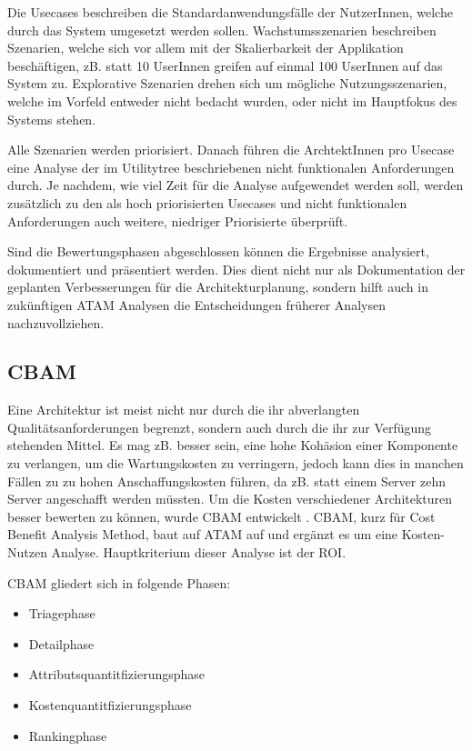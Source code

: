 Die Usecases beschreiben die Standardanwendungsfälle der NutzerInnen, welche durch das System umgesetzt werden sollen. Wachstumsszenarien beschreiben Szenarien, welche sich vor allem mit der Skalierbarkeit der Applikation beschäftigen, zB. statt 10 UserInnen greifen auf einmal 100 UserInnen auf das System zu. Explorative Szenarien drehen sich um mögliche Nutzungsszenarien, welche im Vorfeld entweder nicht bedacht wurden, oder nicht im Hauptfokus des Systems stehen. \cite[S. 63]{review}

Alle Szenarien werden priorisiert. Danach führen die ArchtektInnen pro Usecase eine Analyse der im Utilitytree beschriebenen nicht funktionalen Anforderungen durch. Je nachdem, wie viel Zeit für die Analyse aufgewendet werden soll, werden zusätzlich zu den als hoch priorisierten Usecases und nicht funktionalen Anforderungen auch weitere, niedriger Priorisierte überprüft. \cite[S. 192]{basiswissen}

Sind die Bewertungsphasen abgeschlossen können die Ergebnisse analysiert, dokumentiert und präsentiert werden. Dies dient nicht nur als Dokumentation der geplanten Verbesserungen für die Architekturplanung, sondern hilft auch in zukünftigen ATAM Analysen die Entscheidungen früherer Analysen nachzuvollziehen. \cite[S. 189]{basiswissen}

\subsection{CBAM}

Eine Architektur ist meist nicht nur durch die ihr abverlangten Qualitätsanforderungen begrenzt, sondern auch durch die ihr zur Verfügung stehenden Mittel. Es mag zB. besser sein, eine hohe Kohäsion einer Komponente zu verlangen, um die Wartungskosten zu verringern, jedoch kann dies in manchen Fällen zu zu hohen Anschaffungskosten führen, da zB. statt einem Server zehn Server angeschafft werden müssten. Um die Kosten verschiedener Architekturen besser bewerten zu können, wurde CBAM entwickelt . CBAM, kurz für Cost Benefit Analysis Method, baut auf ATAM auf und ergänzt es um eine Kosten-Nutzen Analyse. Hauptkriterium dieser Analyse ist der ROI. \cite[S. 67-68]{review}

CBAM gliedert sich in folgende Phasen: \cite[S. 68]{review}

\begin{itemize}
  \item \glqq Triagephase\grqq
  \item \glqq Detailphase\grqq
  \item \glqq Attributsquantitfizierungsphase\grqq
  \item \glqq Kostenquantitfizierungsphase\grqq
  \item \glqq Rankingphase\grqq
\end{itemize}

